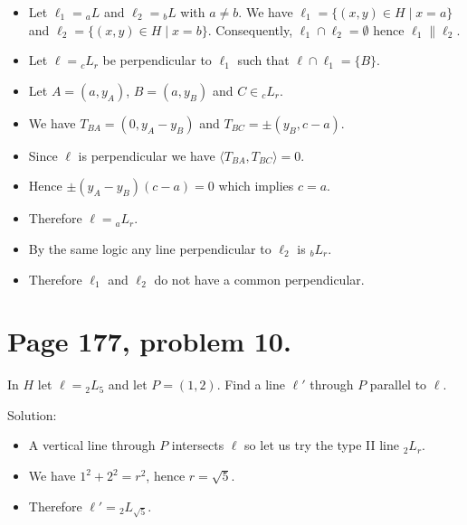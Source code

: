 \documentclass[12pt,openany]{report}
\begin{document}
\begin{itemize}

\item[]
Let $\ell_1={}_aL$ and $\ell_2={}_bL$ with $a\ne b$.
We have $\ell_1=\{(x,y)\in H\mid x=a\}$ and $\ell_2=\{(x,y)\in H\mid x=b\}$.
Consequently, $\ell_1\cap\ell_2=\emptyset$ hence $\ell_1\|\ell_2$.

\item[]
Let $\ell={}_cL_r$ be perpendicular to $\ell_1$ such that $\ell\cap\ell_1=\{B\}$.

\item[]
Let $A=(a,y_A)$, $B=(a,y_B)$ and $C\in{}_cL_r$.

\item[]
We have $T_{BA}=(0,y_A-y_B)$ and $T_{BC}=\pm(y_B,c-a)$.

\item[]
Since $\ell$ is perpendicular we have $\langle T_{BA},T_{BC}\rangle=0$.

\item[]
Hence $\pm(y_A-y_B)(c-a)=0$ which implies $c=a$.

\item[]
Therefore $\ell={}_aL_r$.

\item[]
By the same logic any line perpendicular to $\ell_2$ is ${}_bL_r$.

\item[]
Therefore $\ell_1$ and $\ell_2$ do not have a common perpendicular.

\end{itemize}

\newpage

\section*{Page 177, problem 10.}

In $H$ let $\ell={}_2L_5$ and let $P=(1,2)$.
Find a line $\ell'$ through $P$ parallel to $\ell$.

\bigskip
\noindent
Solution:

\begin{itemize}

\item[]
A vertical line through $P$ intersects $\ell$ so let us try
the type II line ${}_2L_r$.

\item[]
We have $1^2+2^2=r^2$, hence $r=\sqrt5$.

\item[]
Therefore $\ell'={}_2L_{\sqrt5}$.

\end{itemize}
\end{document}
